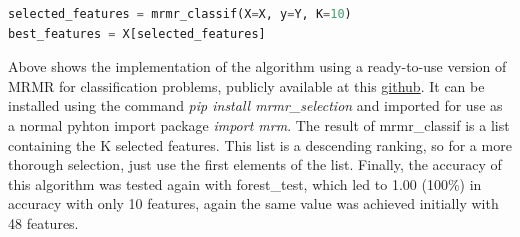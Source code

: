 \begin{lstlisting}[language=Python]
selected_features = mrmr_classif(X=X, y=Y, K=10)
best_features = X[selected_features]
\end{lstlisting}

Above shows the implementation of the algorithm using a ready-to-use version of MRMR for classification problems, publicly available at this \href{https://github.com/smazzanti/mrmr}{github}.
It can be installed using the command \textit{pip install mrmr\_selection} and imported for use as a normal pyhton import package \textit{import mrm}. The result of mrmr\_classif is a list containing the K selected features. This list is a descending ranking, so for a more thorough selection, just use the first elements of the list. Finally, the accuracy of this algorithm was tested again with forest\_test, which led to 1.00 (100\%) in accuracy with only 10 features, again the same value was achieved initially with 48 features.

